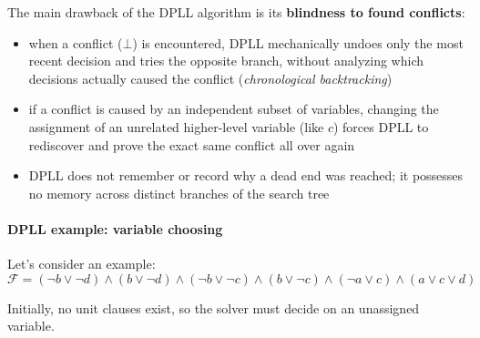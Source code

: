 \documentclass[a4paper, 11pt]{report}
\begin{document}
The main drawback of the DPLL algorithm is its \textbf{blindness to found conflicts}:
\begin{itemize}
    \item  when a conflict ($\bot$) is encountered, DPLL mechanically undoes only the most recent decision and tries the opposite branch, without analyzing which decisions actually caused the conflict (\textit{chronological backtracking})
    \item if a conflict is caused by an independent subset of variables, changing the assignment of an unrelated higher-level variable (like $c$) forces DPLL to rediscover and prove the exact same conflict all over again
    \item DPLL does not remember or record why a dead end was reached; it possesses no memory across distinct branches of the search tree
\end{itemize}

\paragraph{DPLL example: variable choosing}

Let's consider an example:
$$
\mathcal{F} = (\neg b \vee \neg d) \wedge (b \vee \neg d) \wedge (\neg b \vee \neg c) \wedge (b \vee \neg c) \wedge (\neg a \vee c) \wedge (a \vee c \vee d)
$$

Initially, no unit clauses exist, so the solver must decide on an unassigned variable.
\end{document}

